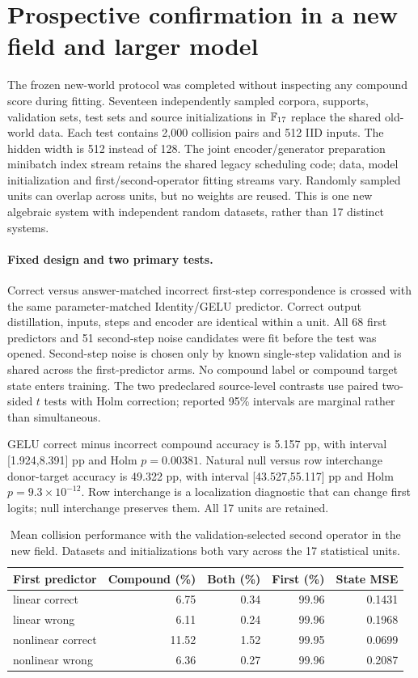 \section{Prospective confirmation in a new field and larger model}\label{sec:fresh}
The frozen new-world protocol was completed without inspecting any compound score during fitting. Seventeen independently sampled corpora, supports, validation sets, test sets and source initializations in $\mathbb{F}_{17}$ replace the shared old-world data. Each test contains 2,000 collision pairs and 512 IID inputs. The hidden width is 512 instead of 128. The joint encoder/generator preparation minibatch index stream retains the shared legacy scheduling code; data, model initialization and first/second-operator fitting streams vary. Randomly sampled units can overlap across units, but no weights are reused. This is one new algebraic system with independent random datasets, rather than 17 distinct systems.

\paragraph{Fixed design and two primary tests.}
Correct versus answer-matched incorrect first-step correspondence is crossed with the same parameter-matched Identity/GELU predictor. Correct output distillation, inputs, steps and encoder are identical within a unit. All 68 first predictors and 51 second-step noise candidates were fit before the test was opened. Second-step noise is chosen only by known single-step validation and is shared across the first-predictor arms. No compound label or compound target state enters training. The two predeclared source-level contrasts use paired two-sided $t$ tests with Holm correction; reported 95\% intervals are marginal rather than simultaneous.

GELU correct minus incorrect compound accuracy is 5.157 pp, with interval [1.924,8.391] pp and Holm $p=0.00381$. Natural null versus row interchange donor-target accuracy is 49.322 pp, with interval [43.527,55.117] pp and Holm $p=9.3\times10^{-12}$. Row interchange is a localization diagnostic that can change first logits; null interchange preserves them. All 17 units are retained.

\begin{table}[ht]\centering\small
\begin{tabular}{lrrrr}\toprule First predictor & Compound (\%) & Both (\%) & First (\%) & State MSE\\\midrule
linear correct & 6.75 & 0.34 & 99.96 & 0.1431 \\
linear wrong & 6.11 & 0.24 & 99.96 & 0.1968 \\
nonlinear correct & 11.52 & 1.52 & 99.95 & 0.0699 \\
nonlinear wrong & 6.36 & 0.27 & 99.96 & 0.2087 \\
\bottomrule\end{tabular}
\caption{Mean collision performance with the validation-selected second operator in the new field. Datasets and initializations both vary across the 17 statistical units.}
\end{table}

